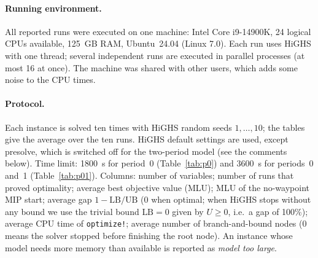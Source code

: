 \documentclass[11pt,a4paper]{article}
\begin{document}
\paragraph{Running environment.} All reported runs were executed on one machine: Intel Core i9-14900K,
24 logical CPUs available, 125~GB RAM, Ubuntu~24.04 (Linux 7.0). Each run uses HiGHS with one thread; several
independent runs are executed in parallel processes (at most 16 at once). The machine was shared with
other users, which adds some noise to the CPU times.

\paragraph{Protocol.} Each instance is solved ten times with HiGHS random seeds $1,\dots,10$; the
tables give the average over the ten runs. HiGHS default settings are used, except presolve, which is switched off
for the two-period model (see the comments below). Time limit: 1800~s for period~0 (Table~\ref{tab:p0}) and
3600~s for periods~0 and~1 (Table~\ref{tab:p01}). Columns: number of variables; number of runs that
proved optimality; average best objective value (MLU); MLU of the no-waypoint MIP start; average gap
$1-\text{LB}/\text{UB}$ (0 when optimal; when HiGHS stops without any bound we use the trivial bound
$\text{LB}=0$ given by $U\ge0$, i.e.\ a gap of 100\%); average CPU time of \texttt{optimize!}; average number of
branch-and-bound nodes (0 means the solver stopped before finishing the root node).
An instance whose model needs more memory than available is reported as \emph{model too large}.

\begin{table}[ht]\centering\small
\caption{Period 0 only (no budget constraint), time limit 1800 s, averages over 10 runs.}\label{tab:p0}

\end{table}

\begin{table}[ht]\centering\small
\caption{Periods 0 and 1 with budget constraint, HiGHS presolve off, time limit 3600 s, averages over 10 runs.}\label{tab:p01}

\end{table}

\begin{table}[ht]\centering\small
\caption{Periods 0 and 1 with HiGHS presolve on (default), time limit 3600 s, averages over 10 runs.}\label{tab:p01on}

\end{table}
\end{document}
